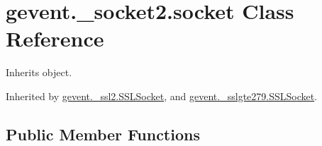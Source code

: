 \hypertarget{classgevent_1_1__socket2_1_1socket}{}\section{gevent.\+\_\+socket2.\+socket Class Reference}
\label{classgevent_1_1__socket2_1_1socket}


Inherits object.



Inherited by \hyperlink{classgevent_1_1__ssl2_1_1_s_s_l_socket}{gevent.\+\_\+ssl2.\+S\+S\+L\+Socket}, and \hyperlink{classgevent_1_1__sslgte279_1_1_s_s_l_socket}{gevent.\+\_\+sslgte279.\+S\+S\+L\+Socket}.

\subsection*{Public Member Functions}
